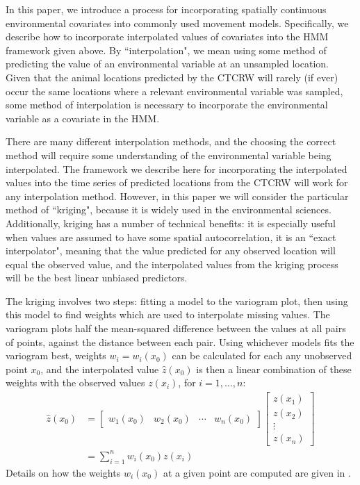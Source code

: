\documentclass[12pt]{article}
\begin{document}
	In this paper, we introduce a process for incorporating spatially continuous environmental covariates into commonly used movement models. Specifically, we describe how to incorporate interpolated values of covariates into the HMM framework given above. By ``interpolation", we mean using some method of predicting the value of an environmental variable at an unsampled location. Given that the animal locations predicted by the CTCRW will rarely (if ever) occur the same locations where a relevant environmental variable was sampled, some method of interpolation is necessary to incorporate the environmental variable as a covariate in the HMM.
	
	There are many different interpolation methods, and the choosing the correct method will require some understanding of the environmental variable being interpolated. The framework we describe here for incorporating the interpolated values into the time series of predicted locations from the CTCRW will work for any interpolation method. However, in this paper we will consider the particular method of ``kriging", because it is widely used in the environmental sciences. Additionally, kriging has a number of technical benefits: it is especially useful when values are assumed to have some spatial autocorrelation, it is an ``exact interpolator", meaning that the value predicted for any observed location will equal the observed value, and the interpolated values from the kriging process will be the best linear unbiased predictors.
	
	The kriging involves two steps: fitting a model to the variogram plot, then using this model to find weights which are used to interpolate missing values. The variogram plots half the mean-squared difference between the values at all pairs of points, against the distance between each pair. Using whichever models fits the variogram best, weights $w_i = w_i(x_0)$ can be calculated for each any unobserved point $x_0$, and the interpolated value $\hat z(x_0)$ is then a linear combination of these weights with the observed values $z(x_i)$, for $i = 1, \ldots, n$:
	\begin{align*}
		\hat z(x_0) &= \begin{bmatrix} w_1(x_0) & w_2(x_0) & \cdots & w_n(x_0) \end{bmatrix} \begin{bmatrix} z(x_1) \\ z(x_2) \\ \vdots \\ z(x_n) \end{bmatrix} \\
		&= \sum_{i = 1}^n w_i(x_0) z(x_i)
	\end{align*}
	Details on how the weights $w_i(x_0)$ at a given point are computed are given in \cite{Bailey1995}.
	
\end{document}
